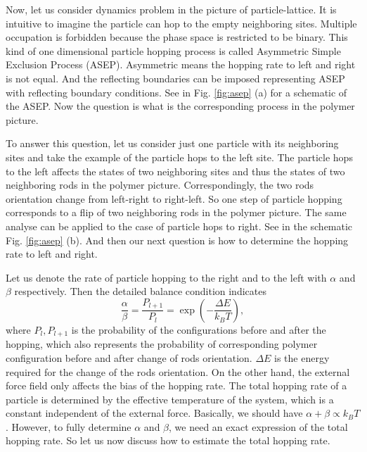 Now, let us consider dynamics problem in the picture of particle-lattice. It is intuitive to imagine the particle can hop to the empty neighboring sites. Multiple occupation is forbidden because the phase space is restricted to be binary. This kind of one dimensional particle hopping process is called Asymmetric Simple Exclusion Process (ASEP). Asymmetric means the hopping rate to left and right is not equal. And the reflecting boundaries can be imposed representing ASEP with reflecting boundary conditions. See in Fig. \ref{fig:asep} (a) for a schematic of the ASEP. Now the question is what is the corresponding process in the polymer picture. 

To answer this question, let us consider just one particle with its neighboring sites and take the example of the particle hops to the left site. The particle hops to the left affects the states of two neighboring sites and thus the states of two neighboring rods in the polymer picture. Correspondingly, the two rods orientation change from left-right to right-left. So one step of particle hopping corresponds to a flip of two neighboring rods in the polymer picture. The same analyse can be applied to the case of particle hops to right. See in the schematic Fig. \ref{fig:asep} (b). And then our next question is how to determine the hopping rate to left and right. 

Let us denote the rate of particle hopping to the right and to the left with $\alpha$ and $\beta$ respectively. Then the detailed balance condition indicates
\begin{equation}
    \label{eq:detailedBalance}
    \frac{\alpha}{\beta} = \frac{P_{l+1}}{P_{l}} = \exp\left(-\frac{\Delta E}{k_B T}\right),
\end{equation}
where $P_l,P_{l+1}$ is the probability of the configurations before and after the hopping, which also represents the probability of corresponding polymer configuration before and after change of rods orientation. $\Delta E$ is the energy required for the change of the rods orientation. 
On the other hand, the external force field only affects the bias of the hopping rate. The total hopping rate of a particle is determined by the effective temperature of the system, which is a constant independent of the external force. Basically, we should have $\alpha + \beta \propto k_{B}T$. However, to fully determine $\alpha$ and $\beta$, we need an exact expression of the total hopping rate. So let us now discuss how to estimate the total hopping rate.

